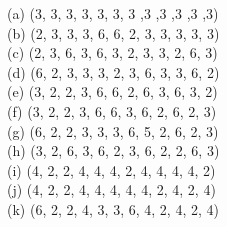 \documentclass[suppldata, dvipdfmx]{interact}
\theoremstyle{plain}%
\theoremstyle{definition}
\theoremstyle{remark}
\theoremstyle{problemstyle}
\begin{document}
\noindent
(a) (3, 3, 3, 3, 3, 3, 3 ,3 ,3 ,3 ,3 ,3)\\
(b) (2, 3, 3, 3, 6, 6, 2, 3, 3, 3, 3, 3)\\
(c) (2, 3, 6, 3, 6, 3, 2, 3, 3, 2, 6, 3)\\
(d) (6, 2, 3, 3, 3, 2, 3, 6, 3, 3, 6, 2)\\
(e) (3, 2, 2, 3, 6, 6, 2, 6, 3, 6, 3, 2)\\
(f) (3, 2, 2, 3, 6, 6, 3, 6, 2, 6, 2, 3)\\
(g) (6, 2, 2, 3, 3, 3, 6, 5, 2, 6, 2, 3)\\
(h) (3, 2, 6, 3, 6, 2, 3, 6, 2, 2, 6, 3)\\
(i) (4, 2, 2, 4, 4, 4, 2, 4, 4, 4, 4, 2)\\
(j) (4, 2, 2, 4, 4, 4, 4, 4, 2, 4, 2, 4)\\
(k) (6, 2, 2, 4, 3, 3, 6, 4, 2, 4, 2, 4)\\
\end{document}
